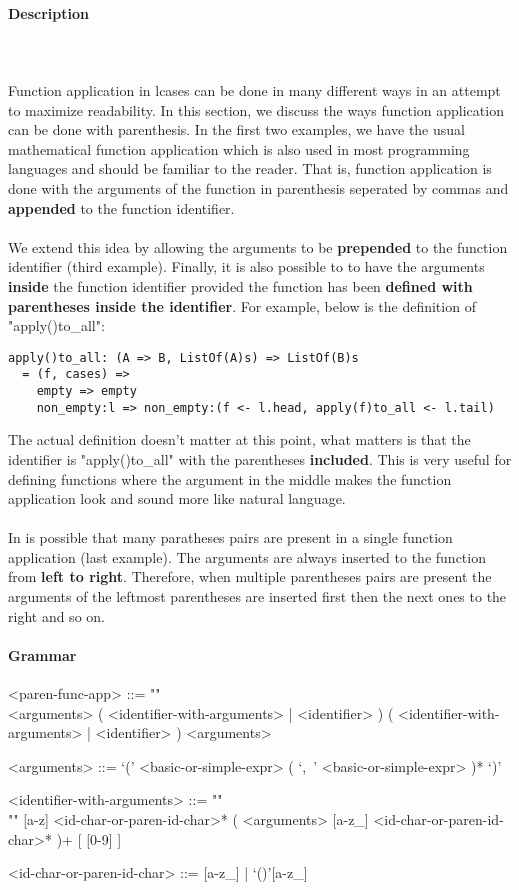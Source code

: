 \documentclass{article}
\def\pend{\mbox{} \\\\}
\begin{document}
\paragraph{Description}\pend
Function application in lcases can be done in many different ways in an attempt to 
maximize readability. In this section, we discuss the ways function application can
be done with parenthesis. In the first two examples, we have the usual mathematical
function application which is also used in most programming languages and
should be familiar to the reader. That is, function application is done with the 
arguments of the function in parenthesis seperated by commas and \textbf{appended}
to the function identifier.
\\\\
We extend this idea by allowing the arguments to be \textbf{prepended} to the
function identifier (third example). Finally, it is also possible to to have
the arguments \textbf{inside} the function identifier provided the function has
been \textbf{defined with parentheses inside the identifier}. For example,
below is the definition of "apply()to\_all":

\begin{verbatim}
apply()to_all: (A => B, ListOf(A)s) => ListOf(B)s
  = (f, cases) =>
    empty => empty
    non_empty:l => non_empty:(f <- l.head, apply(f)to_all <- l.tail)
\end{verbatim}
The actual definition doesn't matter at this point, what matters is that the 
identifier is "apply()to\_all" with the parentheses \textbf{included}. This is very
useful for defining functions where the argument in the middle makes the function
application look and sound more like natural language.
\\\\
In is possible that many paratheses pairs are present in a single function
application (last example). The arguments are always inserted to the function
from \textbf{left to right}.  Therefore, when multiple parentheses pairs are
present the arguments of the leftmost parentheses are inserted first then the
next ones to the right and so on.

\paragraph{Grammar}
\begin{grammar}
<paren-func-app> ::= ""\\
<arguments> ( <identifier-with-arguments> | <identifier> )
\alt ( <identifier-with-arguments> | <identifier> ) <arguments>

<arguments> ::=
`(' <basic-or-simple-expr> ( `,\ ' <basic-or-simple-expr> )* `)'

<identifier-with-arguments> ::= ""\\""
[a-z] <id-char-or-paren-id-char>* ( <arguments> [a-z_]
<id-char-or-paren-id-char>* )+ [ [0-9] ]

<id-char-or-paren-id-char> ::= [a-z_] | `()'[a-z_]
\end{grammar}
\end{document}
